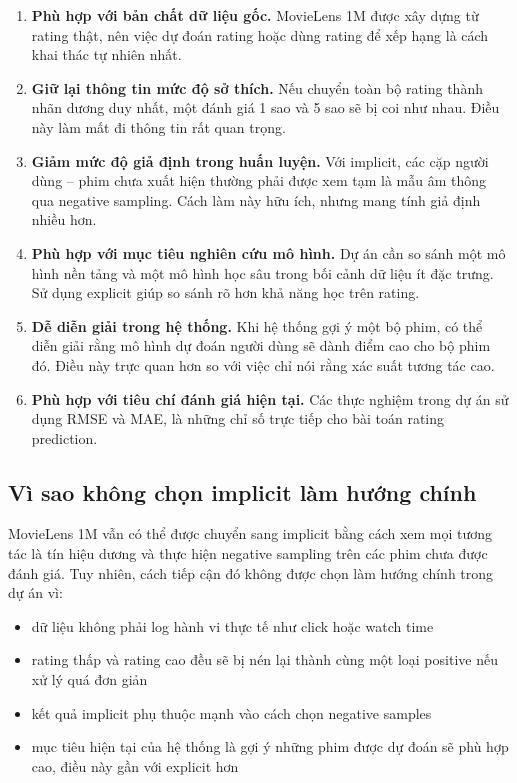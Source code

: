 \documentclass[12pt,a4paper]{article}
\begin{document}
\begin{enumerate}[leftmargin=1.5cm]
    \item \textbf{Phù hợp với bản chất dữ liệu gốc.} MovieLens 1M được xây dựng từ rating thật, nên việc dự đoán rating hoặc dùng rating để xếp hạng là cách khai thác tự nhiên nhất.
    \item \textbf{Giữ lại thông tin mức độ sở thích.} Nếu chuyển toàn bộ rating thành nhãn dương duy nhất, một đánh giá 1 sao và 5 sao sẽ bị coi như nhau. Điều này làm mất đi thông tin rất quan trọng.
    \item \textbf{Giảm mức độ giả định trong huấn luyện.} Với implicit, các cặp người dùng -- phim chưa xuất hiện thường phải được xem tạm là mẫu âm thông qua negative sampling. Cách làm này hữu ích, nhưng mang tính giả định nhiều hơn.
    \item \textbf{Phù hợp với mục tiêu nghiên cứu mô hình.} Dự án cần so sánh một mô hình nền tảng và một mô hình học sâu trong bối cảnh dữ liệu ít đặc trưng. Sử dụng explicit giúp so sánh rõ hơn khả năng học trên rating.
    \item \textbf{Dễ diễn giải trong hệ thống.} Khi hệ thống gợi ý một bộ phim, có thể diễn giải rằng mô hình dự đoán người dùng sẽ dành điểm cao cho bộ phim đó. Điều này trực quan hơn so với việc chỉ nói rằng xác suất tương tác cao.
    \item \textbf{Phù hợp với tiêu chí đánh giá hiện tại.} Các thực nghiệm trong dự án sử dụng RMSE và MAE, là những chỉ số trực tiếp cho bài toán rating prediction.
\end{enumerate}

\subsection{Vì sao không chọn implicit làm hướng chính}

MovieLens 1M vẫn có thể được chuyển sang implicit bằng cách xem mọi tương tác là tín hiệu dương và thực hiện negative sampling trên các phim chưa được đánh giá. Tuy nhiên, cách tiếp cận đó không được chọn làm hướng chính trong dự án vì:

\begin{itemize}[leftmargin=1.5cm]
    \item dữ liệu không phải log hành vi thực tế như click hoặc watch time
    \item rating thấp và rating cao đều sẽ bị nén lại thành cùng một loại positive nếu xử lý quá đơn giản
    \item kết quả implicit phụ thuộc mạnh vào cách chọn negative samples
    \item mục tiêu hiện tại của hệ thống là gợi ý những phim được dự đoán sẽ phù hợp cao, điều này gần với explicit hơn
\end{itemize}
\end{document}
